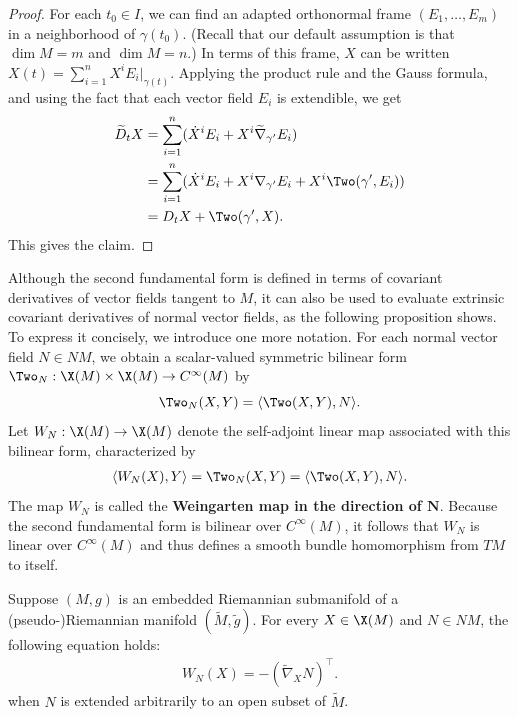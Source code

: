 \begin{proof}
For each $t_0\in I$, we can find an adapted orthonormal frame $(E_1,\dots,E_m)$ in a neighborhood of $\gamma(t_0)$. (Recall that our default assumption is that $\dim M=m$ and $\dim M=n$.) In terms of this frame, $X$ can be written $X(t)=\sum_{i=1}^{n}X^iE_i|_{\gamma(t)}$. Applying the product rule and the Gauss formula, and using the fact that each 
vector field $E_i$ is extendible, we get
\begin{align*}
\widetilde{D}_tX&=\sum_{i=1}^{n}(\dot{X}^iE_i+X^i\widetilde{\nabla}_{\gamma'}E_i)\\
&=\sum_{i=1}^{n}(\dot{X}^iE_i+X^i\nabla_{\gamma'}E_i+X^i\Two(\gamma',E_i))\\
&=D_tX+\Two(\gamma',X).
\end{align*}
This gives the claim.
\end{proof}
Although the second fundamental form is defined in terms of covariant derivatives of vector fields tangent to $M$, it can also be used to evaluate extrinsic covariant derivatives of normal vector fields, as the following proposition shows. To express it concisely, we introduce one more notation. For each normal vector field $N\in NM$, we obtain a scalar-valued symmetric bilinear form $\Two_N:\X(M)\times\X(M)\to C^{\infty}(M)$ by
\[\Two_N(X,Y)=\langle\Two(X,Y),N\rangle.\]
Let $W_N:\X(M)\to\X(M)$ denote the self-adjoint linear map associated with this bilinear form, characterized by
\begin{align}\label{Riemann Weingarten def}
\langle W_N(X),Y\rangle=\Two_N(X,Y)=\langle\Two(X,Y),N\rangle.
\end{align}
The map $W_N$ is called the \textbf{Weingarten map in the direction of $\bm{N}$}. Because the second fundamental form is bilinear over $C^\infty(M)$, it follows that $W_N$ is linear over $C^\infty(M)$ and thus defines a smooth bundle homomorphism from $TM$ to itself.
\begin{proposition}
Suppose $(M,g)$ is an embedded Riemannian submanifold of a (pseudo-)Riemannian manifold $(\widetilde{M},\tilde{g})$. For every $X\in\X(M)$ and $N\in NM$, the following equation holds:
\begin{align}\label{Riemann Weingarten Equation}
W_N(X)=-(\widetilde{\nabla}_XN)^{\top}.
\end{align}
when $N$ is extended arbitrarily to an open subset of $\widetilde{M}$.
\end{proposition}
